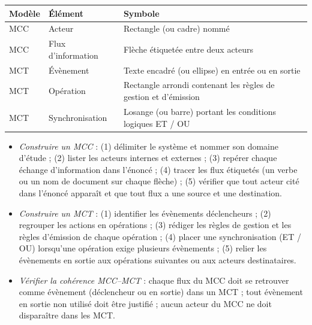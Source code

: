 \documentclass[11pt]{article}
\begin{document}
\begin{aretenir}
\begin{center}
\begin{tabularx}{\linewidth}{|l|X|X|}
\hline
\rowcolor{popblueL} \textbf{Modèle} & \textbf{Élément} & \textbf{Symbole} \\
\hline
MCC & Acteur & Rectangle (ou cadre) nommé \\
\hline
MCC & Flux d'information & Flèche étiquetée entre deux acteurs \\
\hline
MCT & Évènement & Texte encadré (ou ellipse) en entrée ou en sortie \\
\hline
MCT & Opération & Rectangle arrondi contenant les règles de gestion et d'émission \\
\hline
MCT & Synchronisation & Losange (ou barre) portant les conditions logiques ET / OU \\
\hline
\end{tabularx}
\end{center}
\end{aretenir}

\begin{methode}
\begin{itemize}
  \item \emph{Construire un MCC} : (1) délimiter le système et nommer son domaine d'étude ; (2) lister les acteurs internes et externes ; (3) repérer chaque échange d'information dans l'énoncé ; (4) tracer les flux étiquetés (un verbe ou un nom de document sur chaque flèche) ; (5) vérifier que tout acteur cité dans l'énoncé apparaît et que tout flux a une source et une destination.
  \item \emph{Construire un MCT} : (1) identifier les évènements déclencheurs ; (2) regrouper les actions en opérations ; (3) rédiger les règles de gestion et les règles d'émission de chaque opération ; (4) placer une synchronisation (ET / OU) lorsqu'une opération exige plusieurs évènements ; (5) relier les évènements en sortie aux opérations suivantes ou aux acteurs destinataires.
  \item \emph{Vérifier la cohérence MCC--MCT} : chaque flux du MCC doit se retrouver comme évènement (déclencheur ou en sortie) dans un MCT ; tout évènement en sortie non utilisé doit être justifié ; aucun acteur du MCC ne doit disparaître dans les MCT.
\end{itemize}
\end{methode}
\end{document}
